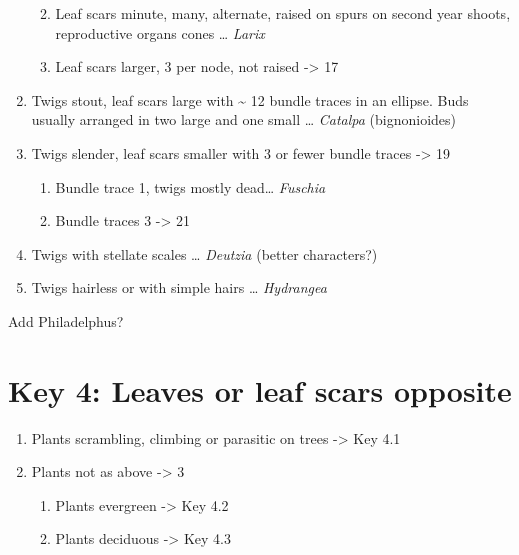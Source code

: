 \documentclass[openany]{book}
\providecommand{\tightlist}{%
  \setlength{\itemsep}{0pt}\setlength{\parskip}{0pt}}
\begin{document}
\begin{enumerate}
  \begin{enumerate}
  \def\labelenumii{\arabic{enumii}.}
  \setcounter{enumii}{14}
  \tightlist
  \item
    Leaf scars minute, many, alternate, raised on spurs on second year
    shoots, reproductive organs cones \ldots{} \emph{Larix}
  \item
    Leaf scars larger, 3 per node, not raised -\textgreater{} 17
  \end{enumerate}
\item
  Twigs stout, leaf scars large with \textasciitilde{} 12 bundle traces
  in an ellipse. Buds usually arranged in two large and one small
  \ldots{} \emph{Catalpa} (bignonioides)
\item
  Twigs slender, leaf scars smaller with 3 or fewer bundle traces
  -\textgreater{} 19

  \begin{enumerate}
  \def\labelenumii{\arabic{enumii}.}
  \setcounter{enumii}{18}
  \tightlist
  \item
    Bundle trace 1, twigs mostly dead\ldots{} \emph{Fuschia}
  \item
    Bundle traces 3 -\textgreater{} 21
  \end{enumerate}
\item
  Twigs with stellate scales \ldots{} \emph{Deutzia} (better
  characters?)
\item
  Twigs hairless or with simple hairs \ldots{} \emph{Hydrangea}
\end{enumerate}

Add Philadelphus?

\hypertarget{key-4-leaves-or-leaf-scars-opposite-1}{%
\section{Key 4: Leaves or leaf scars
opposite}\label{key-4-leaves-or-leaf-scars-opposite-1}}

\begin{enumerate}
\def\labelenumi{\arabic{enumi}.}
\tightlist
\item
  Plants scrambling, climbing or parasitic on trees -\textgreater{} Key
  4.1
\item
  Plants not as above -\textgreater{} 3

  \begin{enumerate}
  \def\labelenumii{\arabic{enumii}.}
  \setcounter{enumii}{2}
  \tightlist
  \item
    Plants evergreen -\textgreater{} Key 4.2
  \item
    Plants deciduous -\textgreater{} Key 4.3
  \end{enumerate}
\end{enumerate}
\end{document}
